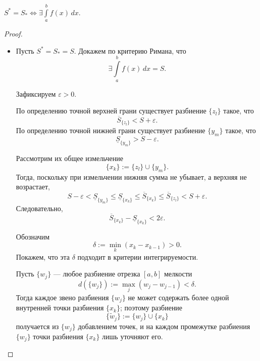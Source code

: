 \documentclass[12pt]{article}
\newcommand{\dint}{\displaystyle\int}
\begin{document}
	\begin{lemma}
        $S^* = S_* \Leftrightarrow \exists \dint\limits_a^b f(x)\,dx$.
    \end{lemma}
    
    \begin{proof}
        \begin{itemize}
            \item[$\Rightarrow$]
            
            Пусть $S^* = S_* = S$. Докажем по критерию Римана, что
            \[
                \exists \int\limits_a^b f(x)\,dx = S.
            \]
            
            Зафиксируем $\varepsilon > 0$.
            
            По определению точной верхней грани существует разбиение $\{z_l\}$ такое, что
            \[
                \overline S_{\{z_l\}} < S + \varepsilon.
            \]
            По определению точной нижней грани существует разбиение $\{y_m\}$ такое, что
            \[
                \underline S_{\{y_m\}} > S - \varepsilon.
            \]
            
            Рассмотрим их общее измельчение
            \[
                \{x_k\} := \{z_l\} \cup \{y_m\}.
            \]
            Тогда, поскольку при измельчении нижняя сумма не убывает, а верхняя не возрастает,
            \[
                S - \varepsilon
                < \underline S_{\{y_m\}}
                \le \underline S_{\{x_k\}}
                \le \overline S_{\{x_k\}}
                \le \overline S_{\{z_l\}}
                < S + \varepsilon.
            \]
            Следовательно,
            \[
                \overline S_{\{x_k\}} - \underline S_{\{x_k\}} < 2\varepsilon.
            \]
            
            Обозначим
            \[
                \delta := \min_{k} (x_k - x_{k-1}) > 0.
            \]
            Покажем, что эта $\delta$ подходит в критерии интегрируемости.
            
            Пусть $\{w_j\}$ --- любое разбиение отрезка $[a,b]$ мелкости
            \[
                d(\{w_j\}) := \max_j (w_j - w_{j-1}) < \delta.
            \]
            Тогда каждое звено разбиения $\{w_j\}$ не может содержать более одной внутренней точки разбиения $\{x_k\}$; поэтому разбиение
            \[
                \{\widetilde w_j\} := \{w_j\} \cup \{x_k\}
            \]
            получается из $\{w_j\}$ добавлением точек, и на каждом промежутке разбиения $\{w_j\}$ точки разбиения $\{x_k\}$ лишь уточняют его.
            

\end{itemize}
\end{proof}
\end{document}
